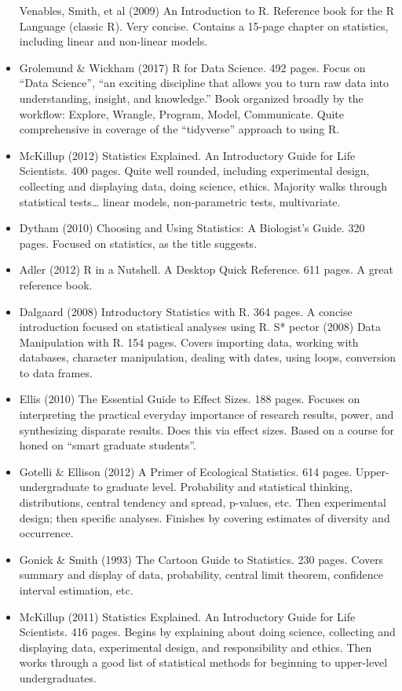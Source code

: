 \documentclass[]{book}
\begin{document}
\begin{itemize}
  Venables, Smith, et al (2009) An Introduction to R. Reference book for the R Language (classic R). Very concise. Contains a 15-page chapter on statistics, including linear and non-linear models.
\item
  Grolemund \& Wickham (2017) R for Data Science. 492 pages. Focus on ``Data Science'', ``an exciting discipline that allows you to turn raw data into understanding, insight, and knowledge.'' Book organized broadly by the workflow: Explore, Wrangle, Program, Model, Communicate. Quite comprehensive in coverage of the ``tidyverse'' approach to using R.
\item
  McKillup (2012) Statistics Explained. An Introductory Guide for Life Scientists. 400 pages. Quite well rounded, including experimental design, collecting and displaying data, doing science, ethics. Majority walks through statistical tests\ldots{} linear models, non-parametric tests, multivariate.
\item
  Dytham (2010) Choosing and Using Statistics: A Biologist's Guide. 320 pages. Focused on statistics, as the title suggests.
\item
  Adler (2012) R in a Nutshell. A Desktop Quick Reference. 611 pages. A great reference book.
\item
  Dalgaard (2008) Introductory Statistics with R. 364 pages. A concise introduction focused on statistical analyses using R.
  S* pector (2008) Data Manipulation with R. 154 pages. Covers importing data, working with databases, character manipulation, dealing with dates, using loops, conversion to data frames.
\item
  Ellis (2010) The Essential Guide to Effect Sizes. 188 pages. Focuses on interpreting the practical everyday importance of research results, power, and synthesizing disparate results. Does this via effect sizes. Based on a course for honed on ``smart graduate students''.
\item
  Gotelli \& Ellison (2012) A Primer of Ecological Statistics. 614 pages. Upper-undergraduate to graduate level. Probability and statistical thinking, distributions, central tendency and spread, p-values, etc. Then experimental design; then specific analyses. Finishes by covering estimates of diversity and occurrence.
\item
  Gonick \& Smith (1993) The Cartoon Guide to Statistics. 230 pages. Covers summary and display of data, probability, central limit theorem, confidence interval estimation, etc.
\item
  McKillup (2011) Statistics Explained. An Introductory Guide for Life Scientists. 416 pages. Begins by explaining about doing science, collecting and displaying data, experimental design, and responsibility and ethics. Then works through a good list of statistical methods for beginning to upper-level undergraduates.

\end{itemize}
\end{document}
